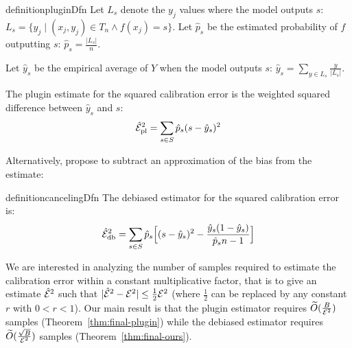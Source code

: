 \begin{restatable}{definition}{pluginDfn}
\label{dfn:plugin-estimator}
  Let $L_s$ denote the $y_j$ values where the model outputs $s$: $L_s = \{ y_j \; | \; (x_j, y_j) \in T_n\wedge f(x_j) = s \}$. Let $\hat{p}_s$ be the estimated probability of $f$ outputting $s$:
$\hat{p}_s = \frac{|L_s|}{n}$.

Let $\hat y_s$ be the empirical average of $Y$ when the model outputs $s$: $\hat y_s = \sum_{y \in L_s} \frac{y}{|L_s|}$.

  The plugin estimate for the squared calibration error is the weighted squared difference between $\hat y_s$ and $s$:
\[ \hat{\mathcal{E}}_{\textup{pl}}^2{} = \sum_{s \in S} \hat{p}_s (s - \hat y_s)^2 \]
\end{restatable}

Alternatively, \cite{brocker2012empirical, ferro2012bias} propose to subtract an approximation of the bias from the estimate:

\begin{restatable}{definition}{cancelingDfn}
  The debiased estimator for the squared calibration error is:
\[ \hat{\mathcal{E}}_{\textup{db}}^2{} = \sum_{s \in S} \hat{p}_s \Big[ (s - \hat{y}_s)^2 - \frac{\hat{y}_s(1 - \hat{y}_s)}{\hat{p}_sn-1} \Big] \]
\end{restatable}

We are interested in analyzing the number of samples required to estimate the calibration error within a constant multiplicative factor, that is to give an estimate $\hat{\mathcal{E}}^2{}$ such that $\lvert \hat{\mathcal{E}}^2{} - \mathcal{E}^2{} \rvert \leq \frac{1}{2}\mathcal{E}^2{}$ (where $\frac{1}{2}$ can be replaced by any constant $r$ with $0 < r < 1$). Our main result is that the plugin estimator requires $\widetilde{O}(\frac{B}{\mathcal{E}^2{}})$ samples (Theorem~\ref{thm:final-plugin}) while the debiased estimator requires $\widetilde{O}(\frac{\sqrt{B}}{\mathcal{E}^2{}})$ samples (Theorem~\ref{thm:final-ours}).


